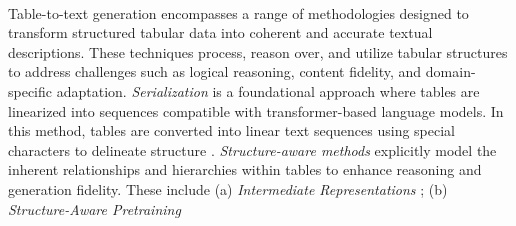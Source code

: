 \paragraph{%
}
Table-to-text generation encompasses a range of methodologies designed to transform structured tabular data into coherent and accurate textual descriptions. These techniques process, reason over, and utilize tabular structures to address challenges such as logical reasoning, content fidelity, and domain-specific adaptation. %
%
\emph{Serialization} is a foundational approach where tables are linearized into sequences compatible with transformer-based language models. In this method, tables are converted into linear text sequences using special characters to delineate structure %
\citep{BENCHMARKS2021_149e9677,parikh-etal-2020-totto,andrejczuk-etal-2022-table}. %
% 
\emph{Structure-aware methods} explicitly model the inherent relationships and hierarchies within tables to enhance reasoning and generation fidelity. These include (a) \emph{Intermediate Representations} %
\cite{zhao-etal-2023-loft,zhao-etal-2023-sortie,10.1162/tacl_a_00641}; %
(b) \emph{Structure-Aware Pretraining} %
